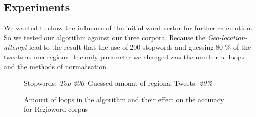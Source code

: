 \documentclass[./Main.tex]{subfiles}
\begin{document}
\subsection{Experiments}
We wanted to show the influence of the initial word vector for further calculation. So we tested our algorithm against our three corpora. Because the \emph{Geo-location-attempt} lead to the result that the use of 200 stopwords and guessing 80 \% of the tweets as non-regional the only parameter we changed was the number of loops and the methods of normalisation.
\begin{figure}

Stopwords: \textit{Top 200}; Guessed amount of regional Tweets: \textit{20\%}
  \caption{Amount of loops in the algorithm and their effect on the accuracy for Regioword-corpus}
  \label{regioword_corpus}
\end{figure}
\end{document}
